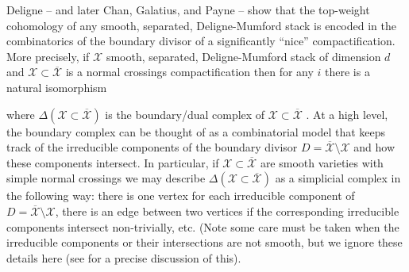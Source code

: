 \documentclass[11pt,reqno]{amsart}
\theoremstyle{remark}
\newcommand{\Gr}{\operatorname{Gr}}
\newcommand{\QQ}{\mathbb{Q}}
\newcommand{\cX}{\mathcal{X}}
\begin{document}
Deligne \cite{Deligne71,Deligne74} -- and later Chan, Galatius, and Payne \cite{CGP21} --  show that the top-weight cohomology of any smooth, separated, Deligne-Mumford stack is encoded in the combinatorics of the boundary divisor of a significantly ``nice'' compactification. More precisely, if $\cX$ smooth, separated, Deligne-Mumford stack of dimension $d$ and $\cX\subset\overline{\cX}$ is a normal crossings compactification then for any $i$ there is a natural isomorphism
\begin{center}
\end{center}
where $\Delta(\cX\subset\overline{\cX})$ is the boundary/dual complex of $\cX\subset \overline{\cX}$ \cite[Theorem~5.8]{CGP21}. At a high level, the boundary complex can be thought of as a combinatorial model that keeps track of the irreducible components of the boundary divisor $D=\overline{\cX}\setminus \cX$ and how these components intersect. In particular, if $\cX\subset \overline{\cX}$ are smooth varieties with simple normal crossings we may describe $\Delta(\cX\subset \overline{\cX})$ as a simplicial complex in the following way: there is one vertex for each irreducible component of $D=\overline{\cX}\setminus \cX$, there is an edge between two vertices if the corresponding irreducible components intersect non-trivially, etc. (Note some care must be taken when the irreducible components or their intersections are not smooth, but we ignore these details here (see \cite[Section 5.1]{CGP21} for a precise discussion of this).
\end{document}
